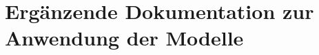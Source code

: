 \chapter[head={Ergänzung zur Anwendung der Modelle}]{Ergänzende Dokumentation zur Anwendung der Modelle}
\label{appchap:add_doc_application}

\lipsum[1]



